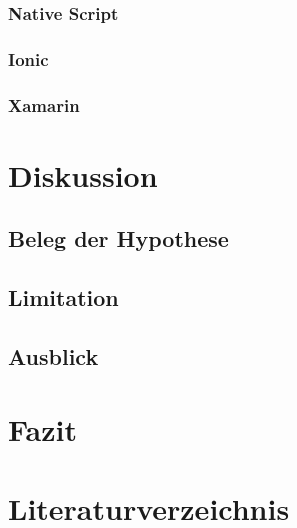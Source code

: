 \documentclass[a4paper]{scrartcl}
\begin{document}
\subsubsection{Native Script}

\subsubsection{Ionic}

\subsubsection{Xamarin}

\section{Diskussion}

\subsection{Beleg der Hypothese}

\subsection{Limitation}

\subsection{Ausblick}

\section{Fazit}


\newpage


\setcounter{page}{6}


\section*{Literaturverzeichnis}

\singlespacing
\end{document}
